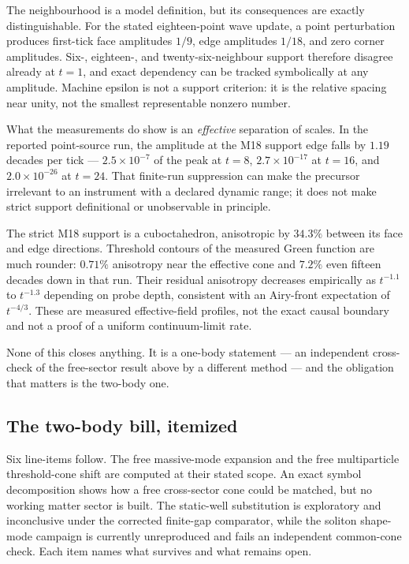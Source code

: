 \documentclass[11pt,a4paper]{article}
\theoremstyle{definition}
\theoremstyle{plain}
\theoremstyle{remark}
\begin{document}
The neighbourhood is a model definition, but its consequences are exactly
distinguishable. For the stated eighteen-point wave update, a point
perturbation produces first-tick face amplitudes $1/9$, edge amplitudes
$1/18$, and zero corner amplitudes. Six-, eighteen-, and twenty-six-neighbour
support therefore disagree already at $t=1$, and exact dependency can be
tracked symbolically at any amplitude. Machine epsilon is not a support
criterion: it is the relative spacing near unity, not the smallest
representable nonzero number.

What the measurements do show is an \emph{effective} separation of scales.
In the reported point-source run, the amplitude at the M18 support edge
falls by $1.19$ decades per tick --- $2.5\times10^{-7}$ of the peak at
$t=8$, $2.7\times10^{-17}$ at $t=16$, and $2.0\times10^{-26}$ at $t=24$.
That finite-run suppression can make the precursor irrelevant to an
instrument with a declared dynamic range; it does not make strict support
definitional or unobservable in principle.

The strict M18 support is a cuboctahedron, anisotropic by $34.3\%$ between
its face and edge directions. Threshold contours of the measured Green
function are much rounder: $0.71\%$ anisotropy near the effective cone and
$7.2\%$ even fifteen decades down in that run. Their residual anisotropy
decreases empirically as $t^{-1.1}$ to $t^{-1.3}$ depending on probe depth,
consistent with an Airy-front expectation of $t^{-4/3}$. These are measured
effective-field profiles, not the exact causal boundary and not a proof of
a uniform continuum-limit rate.

None of this closes anything. It is a one-body statement --- an
independent cross-check of the free-sector result above by a different
method --- and the obligation that matters is the two-body one.

\subsection{The two-body bill, itemized}
\label{sec:twobodybill}

Six line-items follow. The free massive-mode expansion and the free
multiparticle threshold-cone shift are computed at their stated scope. An
exact symbol decomposition shows how a free cross-sector cone could be
matched, but no working matter sector is built. The static-well
substitution is exploratory and inconclusive under the corrected finite-gap
comparator, while the soliton shape-mode campaign is currently
unreproduced and fails an independent common-cone check. Each item names
what survives and what remains open.
\end{document}
